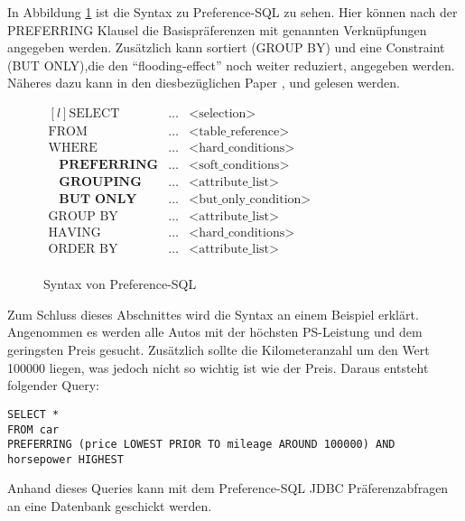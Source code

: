 In Abbildung \ref{img:prefSQLSyntax} ist die Syntax zu Preference-SQL zu sehen. Hier können nach der PREFERRING Klausel die Basispräferenzen mit genannten Verknüpfungen angegeben werden. Zusätzlich kann sortiert (GROUP BY) und eine Constraint (BUT ONLY),die den \enquote{flooding-effect} noch weiter reduziert, angegeben werden. Näheres dazu kann in den diesbezüglichen Paper \cite{kiessling2011preference}, \cite{kiessling2002foundations} und \cite{kiessling2002preference} gelesen werden.

\begin{figure}[H]
\centering
$\begin{matrix*}[l]
\text{SELECT} & \ldots & \text{<selection>} \\
\text{FROM} & \ldots & \text{<table\char`_reference>} \\
\text{WHERE} & \ldots & \text{<hard\char`_conditions>} \\
\hspace{10pt} \textbf{PREFERRING} & \ldots & \text{<soft\char`_conditions>} \\
\hspace{10pt} \textbf{GROUPING} & \ldots & \text{<attribute\char`_list>} \\
\hspace{10pt} \textbf{BUT ONLY} & \ldots & \text{<but\char`_only\char`_condition>} \\
\text{GROUP BY} & \ldots & \text{<attribute\char`_list>} \\
\text{HAVING} & \ldots & \text{<hard\char`_conditions>} \\
\text{ORDER BY} & \ldots & \text{<attribute\char`_list>} \\
\end{matrix*}$
	\caption{Syntax von Preference-SQL}
	\label{img:prefSQLSyntax}
\end{figure} 

Zum Schluss dieses Abschnittes wird die Syntax an einem Beispiel erklärt.
Angenommen es werden alle Autos mit der höchsten PS-Leistung und dem geringsten Preis gesucht. Zusätzlich sollte die Kilometeranzahl um den Wert 100000 liegen, was jedoch nicht so wichtig ist wie der Preis.
Daraus entsteht folgender Query:
\begin{verbatim}
SELECT * 
FROM car 
PREFERRING (price LOWEST PRIOR TO mileage AROUND 100000) AND
horsepower HIGHEST
\end{verbatim}


Anhand dieses Queries kann mit dem Preference-SQL JDBC Präferenzabfragen an eine Datenbank geschickt werden.
